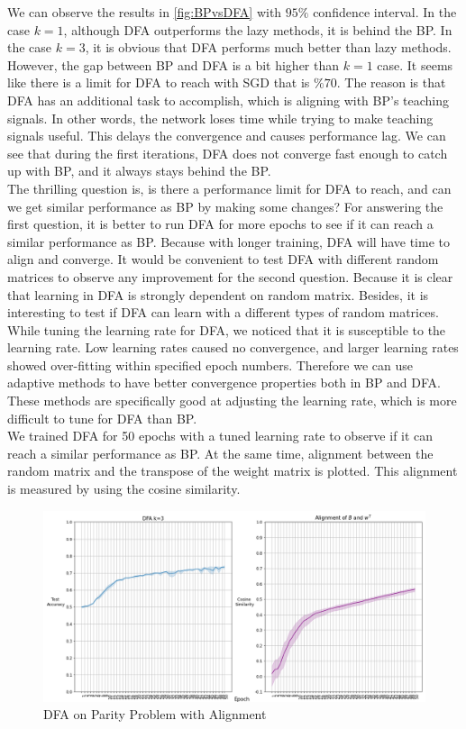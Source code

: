 \documentclass[a4paper, nobind]{templates/ociamthesis}
\begin{document}
\noindent We can observe the results in \ref{fig:BPvsDFA} with \(95\%\) confidence interval. In the case \(k=1\), although DFA outperforms the lazy methods, it is behind the BP. In the case \(k=3\), it is obvious that DFA performs much better than lazy methods. However, the gap between BP and DFA is a bit higher than \(k=1\) case. It seems like there is a limit for DFA to reach with SGD that is \(\%70\). The reason is that DFA has an additional task to accomplish, which is aligning with BP's teaching signals. In other words, the network loses time while trying to make teaching signals useful. This delays the convergence and causes performance lag. We can see that during the first iterations, DFA does not converge fast enough to catch up with BP, and it always stays behind the BP.\\
The thrilling question is, is there a performance limit for DFA to reach, and can we get similar performance as BP by making some changes? For answering the first question, it is better to run DFA for more epochs to see if it can reach a similar performance as BP. Because with longer training, DFA will have time to align and converge. It would be convenient to test DFA with different random matrices to observe any improvement for the second question. Because it is clear that learning in DFA is strongly dependent on random matrix. Besides, it is interesting to test if DFA can learn with a different types of random matrices. While tuning the learning rate for DFA, we noticed that it is susceptible to the learning rate. Low learning rates caused no convergence, and larger learning rates showed over-fitting within specified epoch numbers. Therefore we can use adaptive methods to have better convergence properties both in BP and DFA. These methods are specifically good at adjusting the learning rate, which is more difficult to tune for DFA than BP.\\
\noindent We trained DFA for 50 epochs with a tuned learning rate to observe if it can reach a similar performance as BP. At the same time, alignment between the random matrix and the transpose of the weight matrix is plotted. This alignment is measured by using the cosine similarity.

\begin{figure}

{\centering \includegraphics[width=1\linewidth]{figures/3_k3_SGD_DFA_Alingment} 

}

\caption{DFA on Parity Problem with Alignment}\label{fig:DFA50epochs}
\end{figure}
\end{document}
